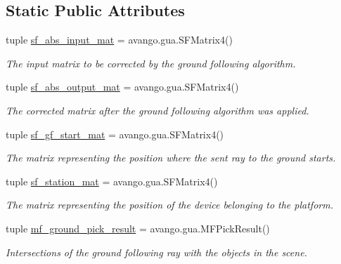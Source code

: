 \subsection*{\-Static \-Public \-Attributes}
\begin{DoxyCompactItemize}
\item 
tuple \hyperlink{classlib_1_1GroundFollowing_1_1GroundFollowing_ae8324e409a0d8af729e0c75e37799fbb}{sf\-\_\-abs\-\_\-input\-\_\-mat} = avango.\-gua.\-S\-F\-Matrix4()
\begin{DoxyCompactList}\small\item\em \-The input matrix to be corrected by the ground following algorithm. \end{DoxyCompactList}\item 
tuple \hyperlink{classlib_1_1GroundFollowing_1_1GroundFollowing_a52efd0a353d19dd1c990b8723da57599}{sf\-\_\-abs\-\_\-output\-\_\-mat} = avango.\-gua.\-S\-F\-Matrix4()
\begin{DoxyCompactList}\small\item\em \-The corrected matrix after the ground following algorithm was applied. \end{DoxyCompactList}\item 
tuple \hyperlink{classlib_1_1GroundFollowing_1_1GroundFollowing_adbae19702e3080255c5463375e7c57e3}{sf\-\_\-gf\-\_\-start\-\_\-mat} = avango.\-gua.\-S\-F\-Matrix4()
\begin{DoxyCompactList}\small\item\em \-The matrix representing the position where the sent ray to the ground starts. \end{DoxyCompactList}\item 
tuple \hyperlink{classlib_1_1GroundFollowing_1_1GroundFollowing_a15123ba4f08697cfe7493a29fc5161e5}{sf\-\_\-station\-\_\-mat} = avango.\-gua.\-S\-F\-Matrix4()
\begin{DoxyCompactList}\small\item\em \-The matrix representing the position of the device belonging to the platform. \end{DoxyCompactList}\item 
tuple \hyperlink{classlib_1_1GroundFollowing_1_1GroundFollowing_a37bf265d037a27939194ac8f4fd65acc}{mf\-\_\-ground\-\_\-pick\-\_\-result} = avango.\-gua.\-M\-F\-Pick\-Result()
\begin{DoxyCompactList}\small\item\em \-Intersections of the ground following ray with the objects in the scene. \end{DoxyCompactList}\end{DoxyCompactItemize}


